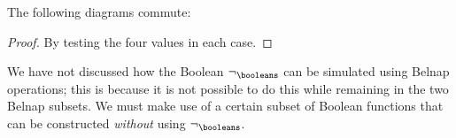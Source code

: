 \begin{lemma}\label{lem:belnap-bool-correspondence}
    The following diagrams commute:
    \begin{center}
        \quad

        \hspace{0.3em}
        \quad
    \end{center}
\end{lemma}
\begin{proof}
    By testing the four values in each case.
\end{proof}

We have not discussed how the Boolean \(\neg_\booleans\) can be simulated using
Belnap operations; this is because it is not possible to do this while
remaining in the two Belnap subsets.
We must make use of a certain subset of Boolean functions that can be
constructed \emph{without} using \(\neg_\booleans\).

